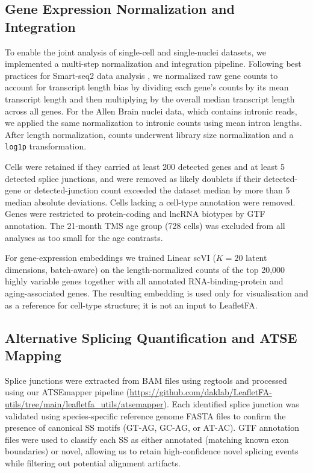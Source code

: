 \subsection*{Gene Expression Normalization and Integration}
\label{sec:GeneExpressionNMF}
To enable the joint analysis of single-cell and single-nuclei datasets, we implemented a multi-step normalization and integration pipeline. Following best practices for Smart-seq2 data analysis \cite{Phipson2017-fw}, we normalized raw gene counts to account for transcript length bias by dividing each gene's counts by its mean transcript length and then multiplying by the overall median transcript length across all genes. For the Allen Brain nuclei data, which contains intronic reads, we applied the same normalization to intronic counts using mean intron lengths. After length normalization, counts underwent library size normalization and a \texttt{log1p} transformation.

Cells were retained if they carried at least 200 detected genes and at least 5 detected splice junctions, and were removed as likely doublets if their detected-gene or detected-junction count exceeded the dataset median by more than 5 median absolute deviations. Cells lacking a cell-type annotation were removed. Genes were restricted to protein-coding and lncRNA biotypes by GTF annotation. The 21-month TMS age group (728 cells) was excluded from all analyses as too small for the age contrasts.


For gene-expression embeddings we trained Linear scVI \cite{linear_scvi} ($K=20$ latent dimensions, batch-aware) on the length-normalized counts of the top 20{,}000 highly variable genes together with all annotated RNA-binding-protein and aging-associated genes. The resulting embedding is used only for visualisation and as a reference for cell-type structure; it is not an input to LeafletFA.

\subsection*{Alternative Splicing Quantification and ATSE Mapping}
Splice junctions were extracted from BAM files using regtools \cite{Regtools} and processed using our ATSEmapper pipeline (\url{https://github.com/daklab/LeafletFA-utils/tree/main/leafletfa_utils/atsemapper}). Each identified splice junction was validated using species-specific reference genome FASTA files to confirm the presence of canonical SS motifs (GT-AG, GC-AG, or AT-AC). GTF annotation files were used to classify each SS as either annotated (matching known exon boundaries) or novel, allowing us to retain high-confidence novel splicing events while filtering out potential alignment artifacts.

